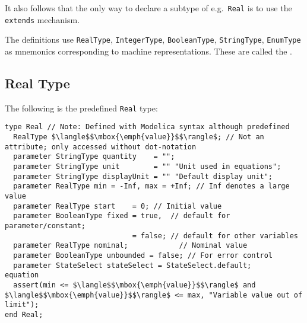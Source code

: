 \begin{nonnormative}
It also follows that the only way to declare a subtype of e.g.\ \lstinline!Real! is to use the \lstinline!extends! mechanism.
\end{nonnormative}

The definitions use \lstinline!RealType!, \lstinline!IntegerType!, \lstinline!BooleanType!, \lstinline!StringType!, \lstinline!EnumType! as mnemonics corresponding to machine representations.
These are called the .

\subsection{Real Type}\label{real-type}

The following is the predefined \lstinline!Real! type:
\begin{lstlisting}[language=modelica]
type Real // Note: Defined with Modelica syntax although predefined
  RealType $\langle$$\mbox{\emph{value}}$$\rangle$; // Not an attribute; only accessed without dot-notation
  parameter StringType quantity    = "";
  parameter StringType unit        = "" "Unit used in equations";
  parameter StringType displayUnit = "" "Default display unit";
  parameter RealType min = -Inf, max = +Inf; // Inf denotes a large value
  parameter RealType start    = 0; // Initial value
  parameter BooleanType fixed = true,  // default for parameter/constant;
                              = false; // default for other variables
  parameter RealType nominal;            // Nominal value
  parameter BooleanType unbounded = false; // For error control
  parameter StateSelect stateSelect = StateSelect.default;
equation
  assert(min <= $\langle$$\mbox{\emph{value}}$$\rangle$ and $\langle$$\mbox{\emph{value}}$$\rangle$ <= max, "Variable value out of limit");
end Real;
\end{lstlisting}%
%
%
%
%
%
%
%
%
%

